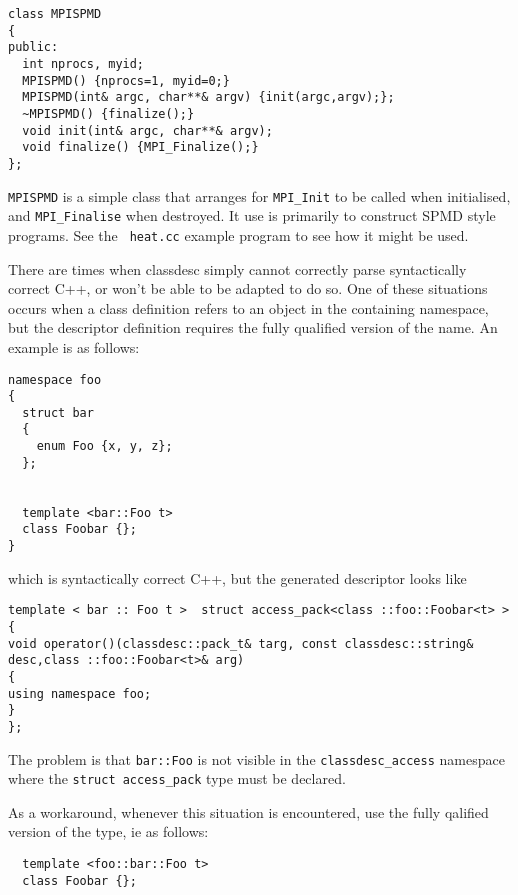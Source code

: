 
\begin{verbatim}
class MPISPMD
{
public:
  int nprocs, myid;
  MPISPMD() {nprocs=1, myid=0;}
  MPISPMD(int& argc, char**& argv) {init(argc,argv);};
  ~MPISPMD() {finalize();}
  void init(int& argc, char**& argv);
  void finalize() {MPI_Finalize();}
};
\end{verbatim}

{\tt MPISPMD} is a simple class that arranges for \verb+MPI_Init+ to
be called when initialised, and \verb+MPI_Finalise+ when destroyed. It
use is primarily to construct SPMD style programs. See the {\tt
heat.cc} example program to see how it might be used.


There are times when classdesc simply cannot correctly parse
syntactically correct C++, or won't be able to be adapted to do
so. One of these situations occurs when a class definition refers to
an object in the containing namespace, but the descriptor definition
requires the fully qualified version of the name. An example is as
follows:

\begin{verbatim}
namespace foo
{
  struct bar
  {
    enum Foo {x, y, z};
  };


  template <bar::Foo t>
  class Foobar {};
}
\end{verbatim}
which is syntactically correct C++, but the generated descriptor looks
like
\begin{verbatim}
template < bar :: Foo t >  struct access_pack<class ::foo::Foobar<t> > {
void operator()(classdesc::pack_t& targ, const classdesc::string& desc,class ::foo::Foobar<t>& arg)
{
using namespace foo;
}
};
\end{verbatim}
The problem is that \verb+bar::Foo+ is not visible in the
\verb+classdesc_access+ namespace where the \verb+struct access_pack+
type must be declared.

As a workaround, whenever this situation is encountered, use the fully
qalified version of the type, ie as follows:
\begin{verbatim}
  template <foo::bar::Foo t>
  class Foobar {};
\end{verbatim}
